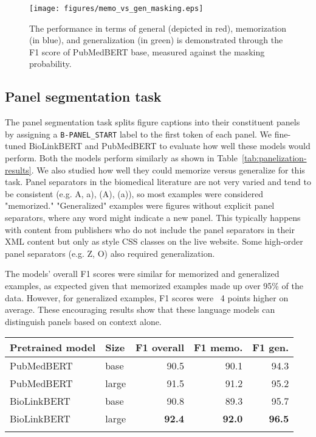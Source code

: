 \documentclass{bioinfo}
\begin{document}
\begin{figure}\centering
\texttt{[image: figures/memo\_vs\_gen\_masking.eps]}
\caption{The performance in terms of general (depicted in red), memorization (in blue), and generalization (in green) is demonstrated through the F1 score of PubMedBERT base, measured against the masking probability.}
\label{fig:memo-vs-gen-masking}
\end{figure}

\subsection{Panel segmentation task}\label{sec:results-panelization}

The panel segmentation task splits figure captions into their constituent panels by assigning a \verb|B-PANEL_START| label to the first token of each panel. We fine-tuned BioLinkBERT and PubMedBERT to evaluate how well these models would perform. Both the models perform similarly as shown in Table~\ref{tab:panelization-results}. We also studied how well they could memorize versus generalize for this task. Panel separators in the biomedical literature are not very varied and tend to be consistent (e.g. A, a),  (A), (a)), so most examples were considered "memorized." "Generalized" examples were figures without explicit panel separators, where any word might indicate a new panel. This typically happens with content from publishers who do not include the panel separators in their XML content but only as style CSS classes on the live website. Some high-order panel separators (e.g. Z, O) also required generalization.

The models' overall F1 scores were similar for memorized and generalized examples, as expected given that memorized examples made up over 95\% of the data. However, for generalized examples, F1 scores were ~4 points higher on average. These encouraging results show that these language models can distinguish panels based on context alone.

\begin{table}[]
 {
\begin{tabular}{@{}llrrr@{}}\toprule
\textbf{Pretrained model} & \textbf{Size} & \textbf{F1 overall} & \textbf{F1 memo.} & \textbf{F1 gen.} \\\midrule
PubMedBERT  & base  & 90.5          & 90.1          & 94.3          \\
PubMedBERT  & large & 91.5          & 91.2          & 95.2          \\
BioLinkBERT & base  & 90.8          & 89.3          & 95.7          \\
BioLinkBERT & large & \textbf{92.4} & \textbf{92.0} & \textbf{96.5} \\\botrule
\end{tabular}
}{}
\end{table}
\end{document}

